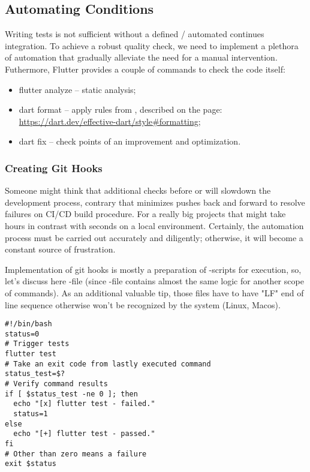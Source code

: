 
\subsection{Automating Conditions}

Writing tests is not sufficient without a defined / automated continues integration. To achieve a robust quality check,
we need to implement a plethora of automation that gradually alleviate the need for a manual intervention. Futhermore,
Flutter provides a couple of commands to check the code itself:

\begin{itemize}
  \item flutter analyze -- static analysis;
  \item dart format -- apply rules from , described on the page:
  \href{https://dart.dev/effective-dart/style\#formatting}{https://dart.dev/effective-dart/style\#formatting};
  \item dart fix -- check points of an improvement and optimization.
\end{itemize}


\subsubsection{Creating Git Hooks}

Someone might think that additional checks before  or  will slowdown the development process,
contrary that minimizes pushes back and forward to resolve failures on CI/CD build procedure. For a really big projects
that might take hours in contrast with seconds on a local environment. Certainly, the automation process must be
carried out accurately and diligently; otherwise, it will become a constant source of frustration.

Implementation of git hooks is mostly a preparation of -scripts for execution, so, let's discuss here
-file (since -file contains almost the same logic for another scope of commands). As an
additional valuable tip, those files have to have "LF" end of line sequence otherwise won't be recognized by the system
(Linux, Macos).

\begin{lstlisting}[language=terminal]
#!/bin/bash
status=0
# Trigger tests
flutter test
# Take an exit code from lastly executed command
status_test=$?
# Verify command results
if [ $status_test -ne 0 ]; then
  echo "[x] flutter test - failed."
  status=1
else
  echo "[+] flutter test - passed."
fi
# Other than zero means a failure
exit $status
\end{lstlisting}

